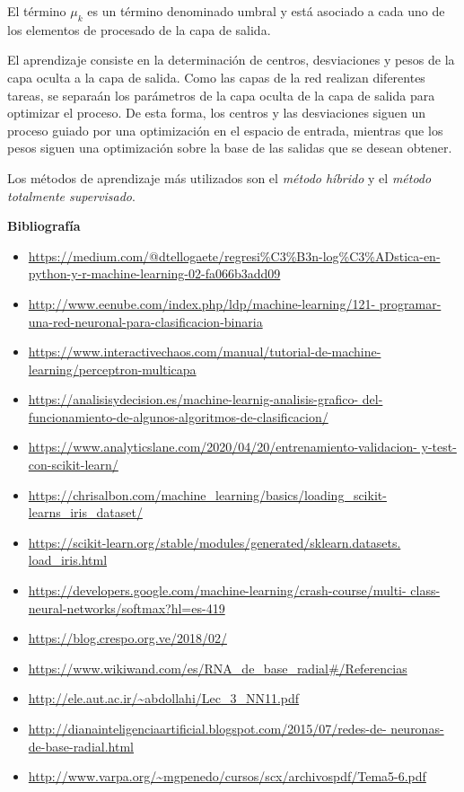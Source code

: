 \documentclass[letterpaper,11pt]{article}
\begin{document}
\begin{enumerate}
\begin{itemize}
        El término $\mu_k$ es un término denominado umbral y está asociado a
        cada uno de los elementos de procesado de la capa de salida. 
    \end{itemize}

    El aprendizaje consiste en la determinación de centros, desviaciones y pesos 
    de la capa oculta a la capa de salida. Como las capas de la red realizan 
    diferentes tareas, se separaán los parámetros de la capa oculta de la capa 
    de salida para optimizar el proceso. De esta forma, los centros y las 
    desviaciones siguen un proceso guiado por una optimización en el espacio de 
    entrada, mientras que los pesos siguen una optimización sobre la base de las 
    salidas que se desean obtener. 

    Los métodos de aprendizaje más utilizados son el \textit{método híbrido} y
    el \textit{método totalmente supervisado}. 
\end{enumerate}

\textbf{Bibliografía}
\begin{itemize}
    \item \url{https://medium.com/@dtellogaete/regresi%
               python-y-r-machine-learning-02-fa066b3add09}
    \item \url{http://www.eenube.com/index.php/ldp/machine-learning/121-
               programar-una-red-neuronal-para-clasificacion-binaria}
    \item \url{https://www.interactivechaos.com/manual/tutorial-de-machine-
               learning/perceptron-multicapa}
    \item \url{https://analisisydecision.es/machine-learnig-analisis-grafico-
               del-funcionamiento-de-algunos-algoritmos-de-clasificacion/}
    \item \url{https://www.analyticslane.com/2020/04/20/entrenamiento-validacion-
               y-test-con-scikit-learn/}
    \item \url{https://chrisalbon.com/machine_learning/basics/loading_scikit-
               learns_iris_dataset/}
    \item \url{https://scikit-learn.org/stable/modules/generated/sklearn.datasets.
               load_iris.html}
    \item \url{https://developers.google.com/machine-learning/crash-course/multi-
               class-neural-networks/softmax?hl=es-419}
    \item \url{https://blog.crespo.org.ve/2018/02/}
    \item \url{https://www.wikiwand.com/es/RNA_de_base_radial#/Referencias}
    \item \url{http://ele.aut.ac.ir/~abdollahi/Lec_3_NN11.pdf}
    \item \url{http://dianainteligenciaartificial.blogspot.com/2015/07/redes-de-
               neuronas-de-base-radial.html}
    \item \url{http://www.varpa.org/~mgpenedo/cursos/scx/archivospdf/Tema5-6.pdf}
\end{itemize}
\end{document}
